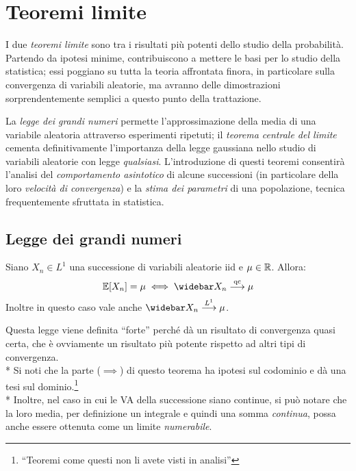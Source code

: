 
\section{Teoremi limite}
I due \emph{teoremi limite} sono tra i risultati più potenti dello studio della probabilità.
Partendo da ipotesi minime, contribuiscono a mettere le basi per lo studio della statistica;
essi poggiano su tutta la teoria affrontata finora, in particolare sulla convergenza di variabili aleatorie, ma avranno delle dimostrazioni sorprendentemente semplici a questo punto della trattazione.

La \emph{legge dei grandi numeri} permette l'approssimazione della media di una variabile aleatoria attraverso esperimenti ripetuti;
il \emph{teorema centrale del limite} cementa definitivamente l'importanza della legge gaussiana nello studio di variabili aleatorie con legge \emph{qualsiasi}.
L'introduzione di questi teoremi consentirà l'analisi del \emph{comportamento asintotico} di alcune successioni (in particolare della loro \emph{velocità di convergenza}) e la \emph{stima dei parametri} di una popolazione, tecnica frequentemente sfruttata in statistica.

\subsection{Legge dei grandi numeri}\label{legge-grandi-numeri}

\begin{teo} 
  Siano $X_n \in L^1$ una successione di variabili aleatorie iid e $\mu \in \mathbb R$. Allora:
  $$\EE[X_n]=\mu \iff \widebar X_n \stackrel{\text{qc}}{\longrightarrow} \mu$$
  Inoltre in questo caso vale anche $\widebar X_n \stackrel{L^1}{\longrightarrow} \mu $.
\end{teo}
Questa legge viene definita ``forte'' perché dà un risultato di convergenza quasi certa, che è ovviamente un risultato più potente rispetto ad altri tipi di convergenza. \\*
Si noti che la parte ($\implies$) di questo teorema ha ipotesi sul codominio e dà una tesi sul dominio.\footnote{``Teoremi come questi non li avete visti in analisi''} \\*
Inoltre, nel caso in cui le VA della successione siano continue, si può notare che la loro media, per definizione un integrale e quindi una somma \emph{continua}, possa anche essere ottenuta come un limite \emph{numerabile}.\\[-9pt]


